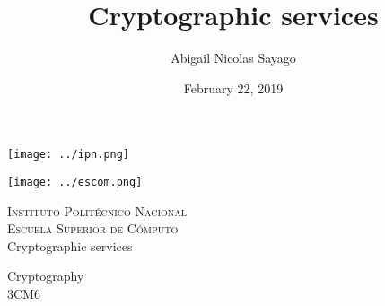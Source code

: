 \documentclass[12pt]{article}
\date{February 22, 2019}
\title{Cryptographic services}
\author{Abigail Nicolas Sayago}
\begin{document}
        \begin{titlepage}
            \begin{center}
                
                
                \noindent
                \begin{minipage}{0.5\textwidth}
                    \begin{flushleft} \large
                        \texttt{[image: ../ipn.png]}
                    \end{flushleft}
                \end{minipage}%
                \begin{minipage}{0.55\textwidth}
                    \begin{flushright} \large
                        \texttt{[image: ../escom.png]}
                    \end{flushright}
                \end{minipage}
                
                \textsc{\LARGE Instituto Politécnico Nacional}\\[0.5cm]
                
                \textsc{\Large Escuela Superior de Cómputo}\\[1cm]
                
                
                { \huge Cryptographic services \\[1cm] }
                
                { \Large Cryptography} \\[1cm]
                
                { \Large 3CM6 } \\[1cm]
                

\end{center}
\end{titlepage}
\end{document}
